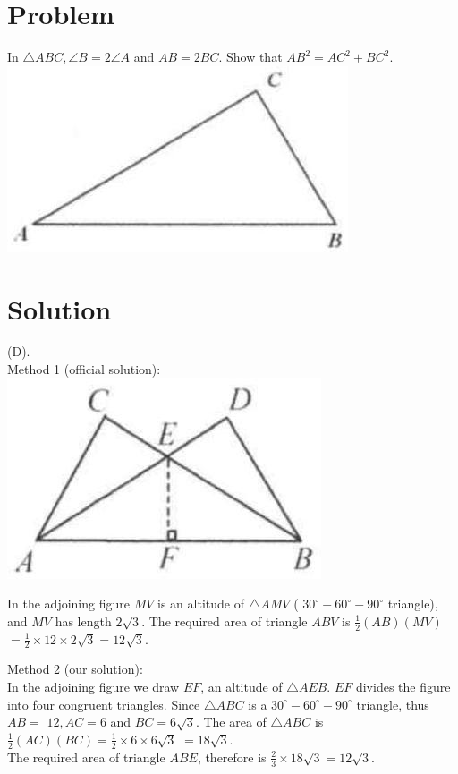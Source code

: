 \documentclass{article}
\begin{document}
\section*{Problem}
In \(\triangle A B C, \angle B=2 \angle A\) and \(A B=2 B C\). Show that \(A B^{2}=A C^{2}+B C^{2}\).\\
\centering
\includegraphics[width=\textwidth]{images/016.jpg}

\section*{Solution}
(D).\\
Method 1 (official solution):\\
\centering
\includegraphics[width=\textwidth]{images/093(2).jpg}


In the adjoining figure \(M V\) is an altitude of \(\triangle A M V\) ( \(30^{\circ}-60^{\circ}-90^{\circ}\) triangle), and \(M V\) has length \(2 \sqrt{3}\). The required area of triangle \(A B V\) is \(\frac{1}{2}(A B)(M V)\)\\
\(=\frac{1}{2} \times 12 \times 2 \sqrt{3}=12 \sqrt{3}\).

Method 2 (our solution):\\
In the adjoining figure we draw \(E F\), an altitude of \(\triangle A E B\). \(E F\) divides the figure into four congruent triangles. Since \(\triangle A B C\) is a \(30^{\circ}-60^{\circ}-90^{\circ}\) triangle, thus \(A B=\) \(12, A C=6\) and \(B C=6 \sqrt{3}\). The area of \(\triangle A B C\) is \(\frac{1}{2}(A C)(B C)=\frac{1}{2} \times 6 \times 6 \sqrt{3}\) \(=18 \sqrt{3}\).\\
The required area of triangle \(A B E\), therefore is \(\frac{2}{3} \times 18 \sqrt{3}=12 \sqrt{3}\).
\end{document}
